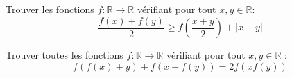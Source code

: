 \begin{exo}
Trouver les fonctions $f:\mathbb{R}\rightarrow \mathbb{R}$ vérifiant pour tout $x,y\in \mathbb{R}$:
$$\frac{f(x)+f(y)}{2}\ge f\left(\frac{x+y}{2}\right)+|x-y|$$
\end{exo}




\begin{exo} %
Trouver toutes les fonctions $f:\mathbb{R}\rightarrow \mathbb{R}$ vérifiant pour tout $x,y\in \mathbb{R}$ :
$$f(f(x)+y)+f(x+f(y))=2f(xf(y))$$
\end{exo}






